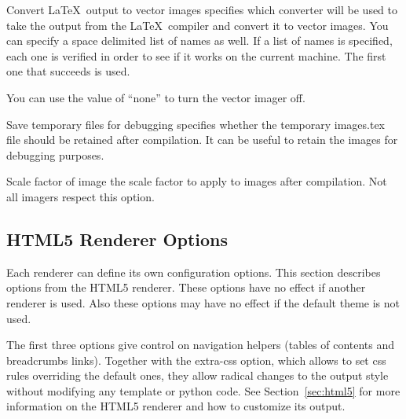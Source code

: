 \begin{configuration}{Convert \LaTeX\ output to vector images}
specifies which converter will be used to take the output from the
\LaTeX\ compiler and convert it to vector images.  You can specify a space
delimited list of names as well.  If a list of names is specified,
each one is verified in order to see if it works on the current machine.
The first one that succeeds is used.

You can use the value of ``none'' to turn the vector imager off.

\end{configuration}

\begin{configuration}{Save temporary files for debugging}
specifies whether the temporary images.tex file should be retained after
compilation. It can be useful to retain the images for debugging purposes.
\end{configuration}

\begin{configuration}{Scale factor of image}
the scale factor to apply to images after compilation. Not all imagers respect
this option.
\end{configuration}

\subsection{HTML5 Renderer Options\label{sec:config-html5}}

Each renderer can define its own configuration options. This section
describes options from the HTML5 renderer. These options have no effect
if another renderer is used. Also these options may have no effect if
the default theme is not used.

The first three options give control on navigation helpers (tables of
contents and breadcrumbs links). Together with the extra-css option,
which allows to set css rules overriding the default ones, they allow
radical changes to the output style without modifying any template or
python code. See Section~\ref{sec:html5} for more information on the
HTML5 renderer and how to customize its output.

